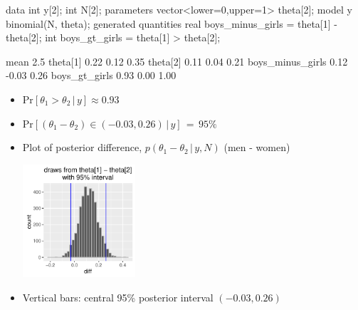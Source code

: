 \documentclass[10pt]{report}
\begin{document}
%
\begin{stancode}
data {
  int y[2];
  int N[2];
}
parameters {
  vector<lower=0,upper=1> theta[2];
}
model {
  y ~ binomial(N, theta);
}
generated quantities {
  real boys_minus_girls = theta[1] - theta[2];
  int boys_gt_girls = theta[1] > theta[2];
}
\end{stancode}


%
\begin{codeout}
                   mean    2.5%
theta[1]           0.22    0.12   0.35
theta[2]           0.11    0.04   0.21
boys_minus_girls   0.12   -0.03   0.26
boys_gt_girls      0.93    0.00   1.00
\end{codeout}
\begin{itemize}
\item
$\mathrm{Pr}[\theta_1 > \theta_2 \,|\, y] \approx 0.93$
\item
$\mathrm{Pr}\left[
(\theta_1 - \theta_2) \in (-0.03, 0.26)
\,|\, y
\right]
\, = \, 95\%$
\end{itemize}


%
\begin{itemize}
\item Plot of posterior difference, $p(\theta_1 - \theta_2 \, | \, y,
  N)$ (men - women)
\begin{center}
\includegraphics[height=1.65in]{img/lefty-posterior.pdf}
\end{center}
\item Vertical bars: central 95\% posterior interval $(-0.03,0.26)$
\end{itemize}


\end{document}
